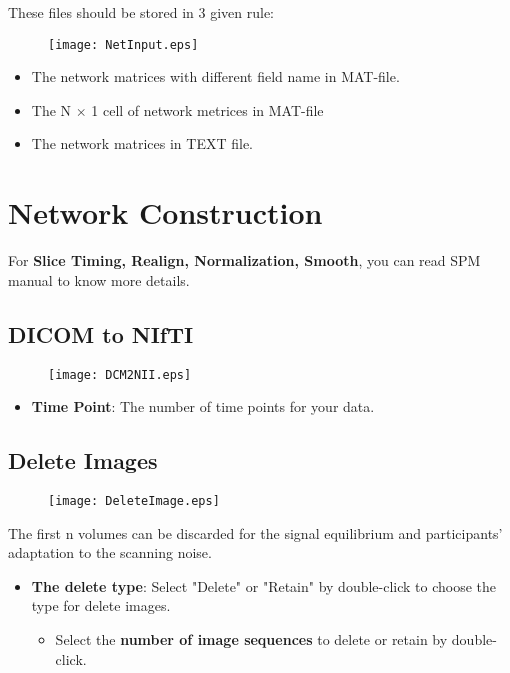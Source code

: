 \documentclass[11pt]{article}
\begin{document}
			These files should be stored in 3 given rule:
			\begin{figure}
				\begin{center}
					\texttt{[image: NetInput.eps]}
				\end{center}
			\end{figure}
			\begin{itemize}
				\item The network matrices with different field name in MAT-file.
				\item The N $\times$ 1 cell of network metrices in MAT-file
				\item The network matrices in TEXT file.
			\end{itemize}		
	\section{Network Construction}
		For \textbf{Slice Timing, Realign, Normalization, Smooth}, you can read SPM manual to know more details.
		\subsection{DICOM to NIfTI}
			\begin{figure}
				\begin{center}
					\texttt{[image: DCM2NII.eps]}
				\end{center}
			\end{figure}
			\begin{itemize}
				\item \textbf{Time Point}: The number of time points for your data.
			\end{itemize}
		\subsection{Delete Images}
			\begin{figure}
				\begin{center}
					\texttt{[image: DeleteImage.eps]}
				\end{center}
			\end{figure}
			The first n volumes can be discarded for the signal equilibrium and participants' adaptation to the scanning noise.
			\begin{itemize}
				\item \textbf{The delete type}: Select "Delete" or "Retain" by double-click to choose the type for delete images.
				\begin{itemize}
					\item Select the \textbf{number of image sequences} to delete or retain by double-click.
				\end{itemize}
			\end{itemize}
\end{document}

